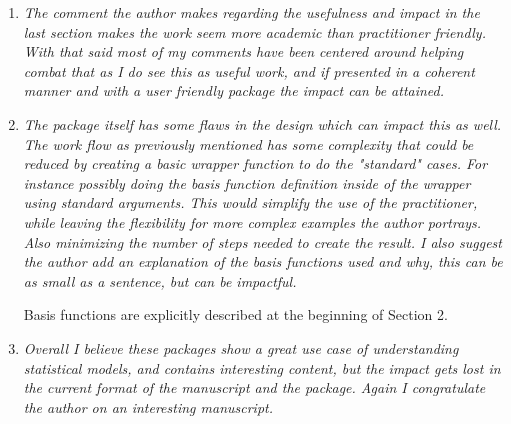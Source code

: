 \documentclass[12pt]{article}
\begin{document}
\begin{enumerate}
\item \textit{The comment the author makes regarding the usefulness and
impact in the last section makes the work seem more academic than
practitioner friendly.  With that said most of my comments have been
centered around helping combat that as I do see this as useful work, and if
presented in a coherent manner and with a user friendly package the impact
can be attained.  }

\item \textit{The package itself has some flaws in the design which can
impact this as well.  The work flow as previously mentioned has some
complexity that could be reduced by creating a basic wrapper function to do
the "standard" cases.  For instance possibly doing the basis function
definition inside of the wrapper using standard arguments.  This would
simplify the use of the practitioner, while leaving the flexibility for more
complex examples the author portrays.  Also minimizing the number of steps
needed to create the result.  I also suggest the author add an explanation
of the basis functions used and why, this can be as small as a sentence, but
can be impactful.  }

Basis functions are explicitly described at the beginning of Section 2.

\item \textit{Overall I believe these packages show a great use case of
understanding statistical models, and contains interesting content, but the
impact gets lost in the current format of the manuscript and the package. 
Again I congratulate the author on an interesting manuscript.}

\end{enumerate}
\end{document}
